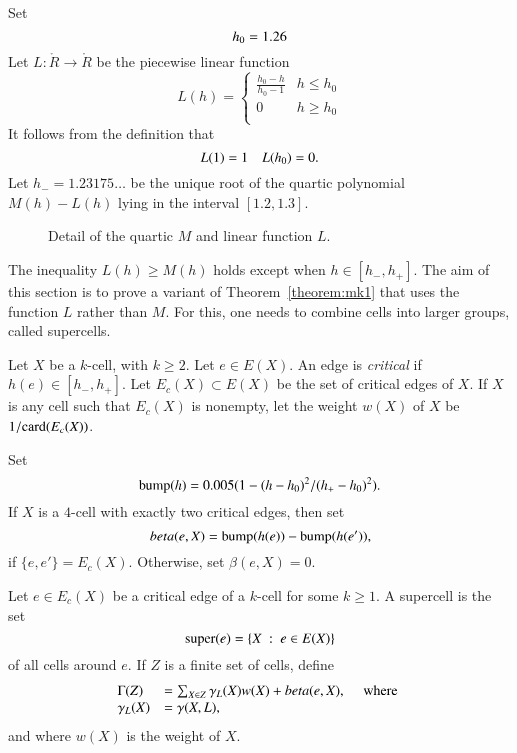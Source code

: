 \begin{definition}
Set
$$
  h_0 = 1.26\\  %
$$
Let $L:\ring{R}\to\ring{R}$ be the piecewise linear function 
$$
L(h) = \begin{cases}
\frac{h_0-h}{h_0-1} & h \le h_0 \\
0 & h\ge h_0 \\
\end{cases}
$$
It follows from the definition that
$$
L(1) = 1\quad L(\hm) = 0.
$$
Let $h_- = 1.23175\ldots$ be the unique root of the quartic polynomial
$M(h)-L(h)$ lying in the interval $[1.2,1.3]$.
\end{definition}

\begin{figure}[htb]
  \centering
  \caption{Detail of the quartic $M$ and linear function $L$.}
  \label{fig:L}
\end{figure}

The inequality $L(h)\ge M(h)$ holds except when $h\in [h_-,h_+]$.  The aim of this section is to prove a variant of Theorem~\ref{theorem:mk1} that uses the function $L$ rather than $M$.  For this, one needs to combine cells into larger groups, called supercells.

\begin{definition}
Let $X$ be a $k$-cell, with $k\ge 2$.  Let $e\in E(X)$.
An edge is {\it critical} if $h(e)\in[h_-,h_+]$.
Let $E_c(X)\subset E(X)$ be the set of critical edges of $X$.  If $X$ is any cell such that $E_c(X)$ is nonempty, let the weight $w(X)$ of $X$  
be $1/\op{card}(E_c(X))$.
\end{definition}

\begin{definition}[$\beta$]  Set 
$$
\op{bump}(h) = 0.005 (1 - (h-h_0)^2/(h_+-h_0)^2).
$$
If $X$ is a $4$-cell with exactly two critical edges, then set
$$
\beta(e,X) = \op{bump}(h(e)) - \op{bump}(h(e')),
$$
if $\{e,e'\} = E_c(X)$.  Otherwise, set $\beta(e,X) = 0$.
\end{definition}

\begin{definition}
Let $e\in E_c(X)$ be a critical edge of a $k$-cell for some $k\ge 1$.
A supercell is the set 
$$
\op{super}(e) = \{X\mid e\in E(X)\} 
$$
of all cells around $e$. 
If $Z$ is a finite set of cells, define
$$
\begin{array}{lll}
\Gamma(Z) &= \sum_{X\in Z} \gamma_L(X) w(X) +\beta(e,X),\quad\hbox{ where }\\
\gamma_L(X) &= \gamma(X,L),
\end{array}
$$
and where $w(X)$ is the weight of $X$.

\end{definition}

